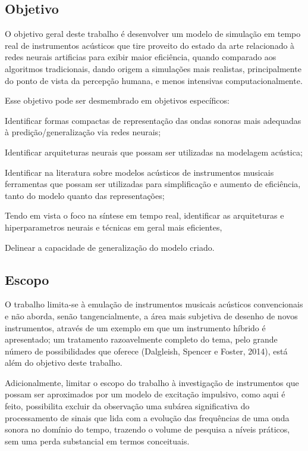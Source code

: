 \documentclass[]{article}
\begin{document}
\hypertarget{objetivo}{%
\subsection{Objetivo}\label{objetivo}}

O objetivo geral deste trabalho é desenvolver um modelo de simulação em
tempo real de instrumentos acústicos que tire proveito do estado da arte
relacionado à redes neurais artificias para exibir maior eficiência,
quando comparado aos algoritmos tradicionais, dando origem a simulações
mais realistas, principalmente do ponto de vista da percepção humana, e
menos intensivas computacionalmente.

Esse objetivo pode ser desmembrado em objetivos específicos:

Identificar formas compactas de representação das ondas sonoras mais
adequadas à predição/generalização via redes neurais;

Identificar arquiteturas neurais que possam ser utilizadas na modelagem
acústica;

Identificar na literatura sobre modelos acústicos de instrumentos
musicais ferramentas que possam ser utilizadas para simplificação e
aumento de eficiência, tanto do modelo quanto das representações;

Tendo em vista o foco na síntese em tempo real, identificar as
arquiteturas e hiperparametros neurais e técnicas em geral mais
eficientes,

Delinear a capacidade de generalização do modelo criado.

\hypertarget{escopo}{%
\subsection{Escopo}\label{escopo}}

O trabalho limita-se à emulação de instrumentos musicais acústicos
convencionais e não aborda, senão tangencialmente, a área mais subjetiva
de desenho de novos instrumentos, através de um exemplo em que um
instrumento híbrido é apresentado; um tratamento razoavelmente completo
do tema, pelo grande número de possibilidades que oferece (Dalgleish,
Spencer e Foster, 2014), está além do objetivo deste trabalho.

Adicionalmente, limitar o escopo do trabalho à investigação de
instrumentos que possam ser aproximados por um modelo de excitação
impulsivo, como aqui é feito, possibilita excluir da observação uma
subárea significativa do processamento de sinais que lida com a evolução
das frequências de uma onda sonora no domínio do tempo, trazendo o
volume de pesquisa a níveis práticos, sem uma perda substancial em
termos conceituais.
\end{document}
